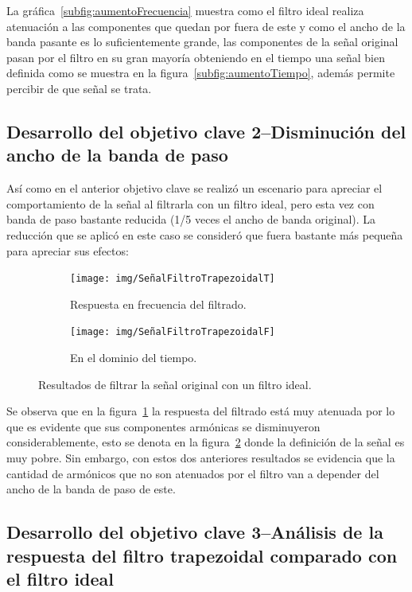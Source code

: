 La gráfica~\ref{subfig:aumentoFrecuencia} muestra como el filtro ideal realiza atenuación a las componentes que quedan por fuera de este y como el ancho de la banda pasante es lo suficientemente grande, las componentes de la señal original pasan por el filtro en su gran mayoría obteniendo en el tiempo una señal bien definida como se muestra en la figura~\ref{subfig:aumentoTiempo}, además permite percibir de que señal se trata.


\subsection{Desarrollo del objetivo clave 2--Disminución del ancho de la banda de paso}
Así como en el anterior objetivo clave se realizó un escenario para apreciar el comportamiento de la señal al filtrarla con un filtro ideal, pero esta vez con banda de paso bastante reducida (1/5 veces el ancho de banda original). La reducción que se aplicó en este caso se consideró que fuera bastante más pequeña para apreciar sus efectos:

\begin{figure}[H]
	\centering
	\begin{subfigure}[b]{0.48\linewidth}
		\texttt{[image: img/SeñalFiltroTrapezoidalT]}
		\caption{\scriptsize Respuesta en frecuencia del filtrado.}
		\label{subfig:disminucionFrecuencia}
	\end{subfigure}
	\begin{subfigure}[b]{0.48\linewidth}
		\texttt{[image: img/SeñalFiltroTrapezoidalF]}
		\caption{\scriptsize En el dominio del tiempo.}
		\label{subfig:disminucionTiempo}
	\end{subfigure}
	\vspace{-3mm}
	\caption{\scriptsize Resultados de filtrar la señal original con un filtro ideal.}
	\label{fig:disminucion}
	\vspace{-5mm}
\end{figure}

Se observa que en la figura~\ref{subfig:disminucionFrecuencia} la respuesta del filtrado está muy atenuada por lo que es evidente que sus componentes armónicas se disminuyeron considerablemente, esto se denota en la figura~\ref{subfig:disminucionTiempo} donde la definición de la señal es muy pobre. Sin embargo, con estos dos anteriores resultados se evidencia que la cantidad de armónicos que no son atenuados por el filtro van a depender del ancho de la banda de paso de este.
\subsection{Desarrollo del objetivo clave 3--Análisis de la respuesta del filtro trapezoidal comparado con el filtro ideal}

